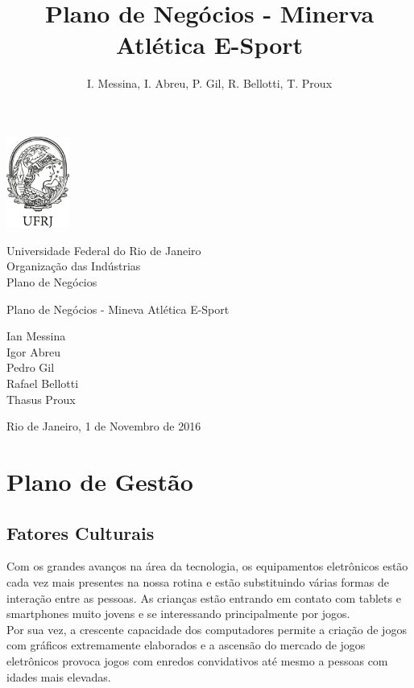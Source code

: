 \documentclass[a4paper, 12pt]{paper}
\author{I. Messina, I. Abreu, P. Gil, R. Bellotti, T. Proux}
\title{Plano de Negócios - Minerva Atlética E-Sport}
\begin{document}
    \begin{titlepage}
    	\begin{minipage}[c][3cm][c]{3cm}
    		\includegraphics[height=3cm]{img/ufrj_logo.png}
    	\end{minipage}
    	\begin{minipage}[c][3cm][c]{10cm}
    		Universidade Federal do Rio de Janeiro \\
    		Organização das Indústrias \\
    		Plano de Negócios
    	\end{minipage}
    	\begin{center}
    		\vspace{95pt}
    		
    		\huge{Plano de Negócios - Mineva Atlética E-Sport}
    		\vspace{260pt}
    	\end{center}
    	
    	\begin{center}
		    		  Ian Messina \\
			    	  Igor Abreu\\
			    	  Pedro Gil\\
			    	  Rafael Bellotti\\
			    	  Thasus Proux\\    			
    	\end{center}
    	
    	\begin{center}
    		\vspace{\fill}
    		Rio de Janeiro, 1 de Novembro de 2016
    	\end{center}
    \end{titlepage}
\newpage
\tableofcontents
\listoffigures
\newpage

\section{Plano de Gestão}
\subsection{Fatores Culturais}
Com os grandes avanços na área da tecnologia, os equipamentos eletrônicos estão cada vez mais presentes na nossa rotina e estão substituindo várias formas de interação entre as pessoas. As crianças estão entrando em contato com tablets e smartphones muito jovens e se interessando principalmente por jogos.\\
Por sua vez, a crescente capacidade dos computadores permite a criação de jogos com gráficos extremamente elaborados e a ascensão do mercado de jogos eletrônicos provoca jogos com enredos convidativos até mesmo a pessoas com idades mais elevadas.
\end{document}

